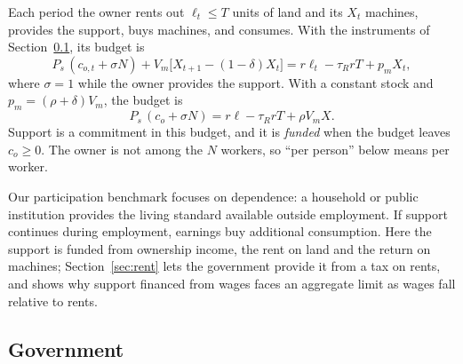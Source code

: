 \documentclass[12pt]{article}
\theoremstyle{plain}
\theoremstyle{definition}
\theoremstyle{remark}
\begin{document}
Each period the owner rents out $\ell_t\le T$ units of land and its $X_t$ machines, provides the support, buys machines, and consumes. With the instruments of Section~\ref{sec:government}, its budget is
\begin{equation}\label{eq:ownerseq}
P_s\,(c_{o,t}+\sigma N)+V_m\bigl[X_{t+1}-(1-\delta)X_t\bigr]=r\ell_t-\tau_RrT+p_mX_t,
\end{equation}
where $\sigma=1$ while the owner provides the support. With a constant stock and $p_m=(\rho+\delta)V_m$, the budget is
\begin{equation}\label{eq:ownerbudget}
P_s\,(c_o+\sigma N)=r\ell-\tau_RrT+\rho V_mX.
\end{equation}
Support is a commitment in this budget, and it is \emph{funded} when the budget leaves $c_o\ge0$. The owner is not among the $N$ workers, so ``per person'' below means per worker.

Our participation benchmark focuses on dependence: a household or public institution provides the living standard available outside employment. If support continues during employment, earnings buy additional consumption.
Here the support is funded from ownership income, the rent on land and the return on machines; Section~\ref{sec:rent} lets the government provide it from a tax on rents, and shows why support financed from wages faces an aggregate limit as wages fall relative to rents.

\subsection{Government}\label{sec:government}
\end{document}

